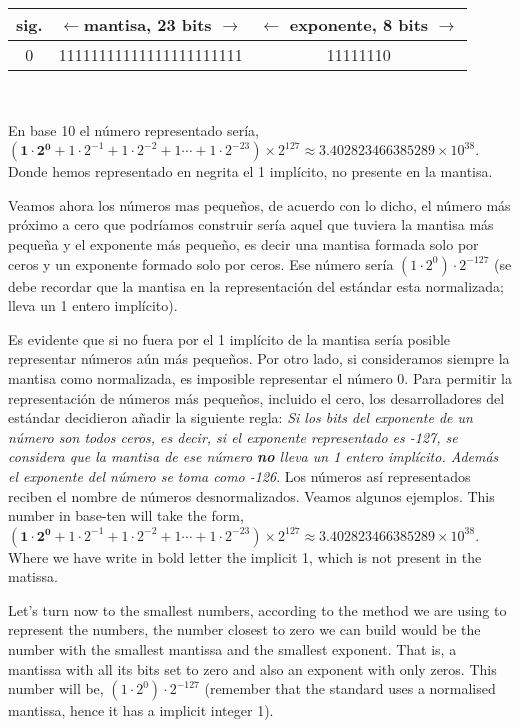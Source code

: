 \begin{minipage}{\textwidth}
	\centering
\begin{tabular}{|c||c||c|}
\hline
sig.&$\leftarrow$mantisa, 23 bits $\rightarrow$&$\leftarrow$ exponente, 8 bits $\rightarrow$\\
\hline
0&11111111111111111111111&11111110\\
\hline
\end{tabular}
\end{minipage}
\ \\
\begin{paracol}{2}
En base 10 el número representado sería, $(\mathbf{1\cdot2^0}+1\cdot2^{-1}+1\cdot2^{-2}+1\cdots+1\cdot2^{-23})\times2^{127}\approx 3.402823466385289\times10^{38}$. Donde hemos representado en negrita el 1 implícito, no presente en la mantisa.
 
Veamos ahora los números mas pequeños, de acuerdo con lo dicho, el número más próximo a cero que podríamos construir sería aquel que tuviera la mantisa más pequeña y el exponente más pequeño, es decir una mantisa formada solo por ceros y un exponente formado solo por ceros. Ese número sería $(1\cdot 2^0)\cdot2^{-127}$ (se debe recordar que la mantisa en la representación del estándar esta normalizada; lleva un 1 entero implícito). 

 Es evidente que si no fuera por el 1 implícito de la mantisa sería posible representar números aún más pequeños. Por otro lado, si consideramos siempre la mantisa como normalizada, es imposible representar el número 0. Para permitir la representación de números más pequeños, incluido el cero, los desarrolladores del estándar decidieron añadir la siguiente regla: \emph{Si los bits del exponente de un número son todos ceros, es decir, si el exponente representado es -127, se considera que la mantisa de ese número \textbf{no} lleva un 1 entero implícito. Además el  exponente del número se toma como -126}. Los números así representados reciben el nombre de números desnormalizados. Veamos algunos ejemplos.
\switchcolumn
This number in base-ten will take the form, $(\mathbf{1\cdot2^0}+1\cdot2^{-1}+1\cdot2^{-2}+1\cdots+1\cdot2^{-23})\times2^{127}\approx 3.402823466385289\times10^{38}$. Where we have write in bold letter the implicit 1, which is not present in the matissa.

Let's turn now to the smallest numbers, according to the method we are using to represent the numbers, the number closest to zero we can build would be the number with the smallest mantissa and the smallest exponent. That is, a mantissa with all its bits set to zero and also an exponent with only zeros. This number will be, $(1\cdot 2^0)\cdot2^{-127}$ (remember that the standard uses a normalised mantissa, hence it has a implicit integer 1).


\end{paracol}
